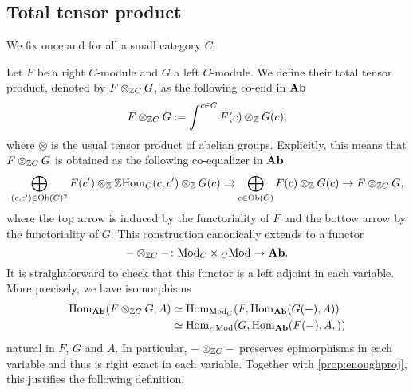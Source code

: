\documentclass{amsart}
\renewcommand{\homset}[3]{\mathrm{Hom}_{#1}(#2,#3)}
\begin{document}
\subsection{Total tensor product}
We fix once and for all a small category $C$.
\begin{paragr}
   Let $F$ be a right $C$\nbd-module and $G$ a left $C$\nbd-module. We
  define their total tensor product, denoted by $F\otimes_{\mathbb Z C}G$, as the
  following co-end in $\mathbf{Ab}$
  \[
    F\otimes_{\mathbb Z C}G := \int^{c \in C}F(c)\otimes_{\mathbb Z} G(c),
  \]
  where $\otimes$ is the usual tensor product of abelian
  groups. Explicitly, this means that $F\otimes_{\mathbb Z C}G$ is obtained as the following
  co-equalizer in $\mathbf{Ab}$
  \[
    \bigoplus_{(c,c')\in \Ob(C)^2}F(c')\tens{\Z}\Z\homset{C}{c}{c'}\tens{\Z}
    G(c) \rightrightarrows \bigoplus_{c \in \Ob(C)}F(c)\tens{\Z} G(c)
    \rightarrow F\tens{\Z C}G,
  \]
  where the top arrow is induced by the functoriality of $F$ and the
  bottow arrow by the functoriality of $G$. This construction canonically extends to a functor
  \[
    - \otimes_{\mathbb Z C} - \colon \mathrm{Mod}_{C}\times{}_{C}\mathrm{Mod} \to \mathbf{Ab}.
  \]
  It is straightforward to check that this functor is a left adjoint
  in each variable. More precisely, we have isomorphisms
  \[
    \begin{aligned}
      \homset{\Ab}{F\tens{\Z C}G}{A}&\simeq
                                  \homset{\RMod{C}}{F}{\homset{\Ab}{G(-)}{A}}\\
      &\simeq \homset{\LMod{C}}{G}{\homset{\Ab}{F(-),A}}
    \end{aligned}
  \]
  natural in $F$, $G$ and $A$. In particular, $-\otimes_{\mathbb Z C}-$ preserves
  epimorphisms in each variable and thus is right exact in each
  variable. Together with \cref{prop:enoughproj}, this justifies the
  following definition.
\end{paragr}
\end{document}
